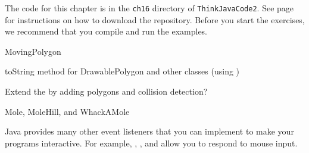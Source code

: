 
The code for this chapter is in the {\tt ch16} directory of {\tt ThinkJavaCode2}.
See page~\pageref{code} for instructions on how to download the repository.
Before you start the exercises, we recommend that you compile and run the examples.

\begin{exercise}
MovingPolygon
\end{exercise}


\begin{exercise}
toString method for DrawablePolygon and other classes (using )
\end{exercise}


\begin{exercise}
Extend the  by adding polygons and collision detection?
\end{exercise}


\begin{exercise}
Mole, MoleHill, and WhackAMole

Java provides many other event listeners that you can implement to make your programs interactive.
For example, , , and  allow you to respond to mouse input.
\end{exercise}
